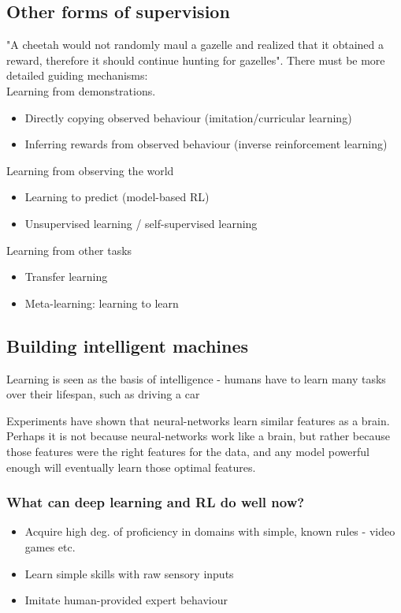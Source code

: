 \documentclass[11pt]{article} %
\begin{document}
\subsection{Other forms of supervision}
"A cheetah would not randomly maul a gazelle and realized that it obtained a reward, therefore it should continue hunting for gazelles". There must be more detailed guiding mechanisms:\\
Learning from demonstrations.
\begin{itemize}
    \item Directly copying observed behaviour (imitation/curricular learning)
    \item Inferring rewards from observed behaviour (inverse reinforcement learning)
\end{itemize}
Learning from observing the world
\begin{itemize}
    \item Learning to predict (model-based RL)
    \item Unsupervised learning / self-supervised learning
\end{itemize}
Learning from other tasks
\begin{itemize}
    \item Transfer learning
    \item Meta-learning: learning to learn
\end{itemize}

\subsection{Building intelligent machines}
Learning is seen as the basis of intelligence - humans have to learn many tasks over their lifespan, such as driving a car

Experiments have shown that neural-networks learn similar features as a brain. Perhaps it is not because neural-networks work like a brain, but rather because those features were the right features for the data, and any model powerful enough will eventually learn those optimal features.

\subsubsection{What can deep learning and RL do well now?}
\begin{itemize}
    \item Acquire high deg. of proficiency in domains with simple, known rules - video games etc.
    \item Learn simple skills with raw sensory inputs
    \item Imitate human-provided expert behaviour
\end{itemize}
\end{document}
